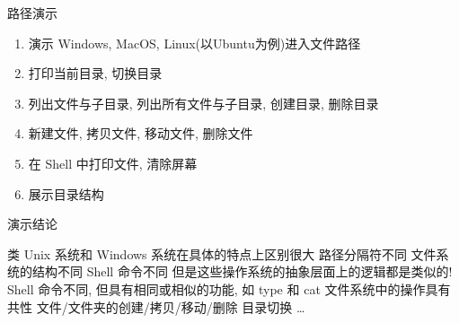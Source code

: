 
\begin{frame}[standout]{路径演示}
    \begin{enumerate}
        \item 演示 Windows, MacOS, Linux(以Ubuntu为例)进入文件路径
        \item 打印当前目录, 切换目录
        \item 列出文件与子目录, 列出所有文件与子目录, 创建目录, 删除目录
        \item 新建文件, 拷贝文件, 移动文件, 删除文件
        \item 在 Shell 中打印文件, 清除屏幕
        \item 展示目录结构
    \end{enumerate}
\end{frame}


\begin{frame}{演示结论}
    \begin{myoutline}
        \1 类 Unix 系统和 Windows 系统在具体的特点上区别很大
            \2 路径分隔符不同
            \2 文件系统的结构不同
            \2 Shell 命令不同
        \1 但是这些操作系统的抽象层面上的逻辑都是类似的!
            \2 Shell 命令不同, 但具有相同或相似的功能, 如 type 和 cat
            \2 文件系统中的操作具有共性
                \3 文件/文件夹的创建/拷贝/移动/删除
                \3 目录切换
                \3 \dots
    \end{myoutline}
\end{frame}



